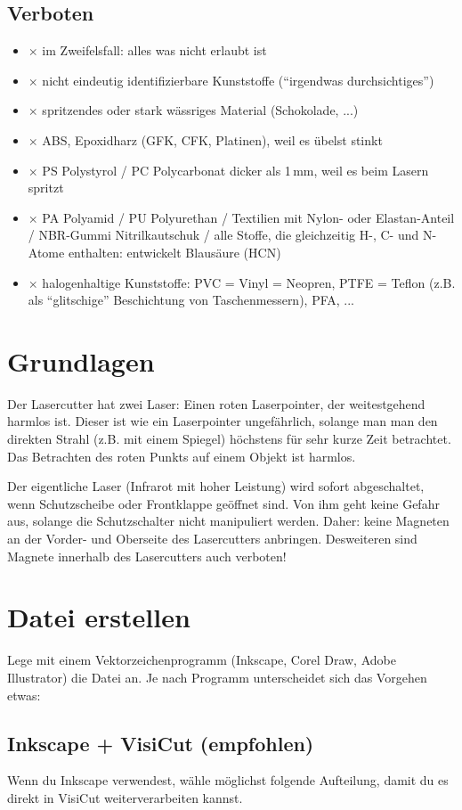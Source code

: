 \documentclass{\basedir/fablab-document}
\begin{document}
	\subsection{Verboten}
	\newcommand{\itemCross}{\item[$\times$]}
	\begin{itemize}
		\itemCross im Zweifelsfall: alles was nicht erlaubt ist
		\itemCross nicht eindeutig identifizierbare Kunststoffe (\enquote{irgendwas durchsichtiges})
		\itemCross spritzendes oder stark wässriges Material (Schokolade, ...)
		\itemCross ABS, Epoxidharz (GFK, CFK, Platinen), weil es übelst stinkt
		\itemCross PS Polystyrol / PC Polycarbonat dicker als 1\,mm, weil es beim Lasern spritzt
		\itemCross PA Polyamid / PU Polyurethan / Textilien mit Nylon- oder Elastan-Anteil / NBR-Gummi Nitrilkautschuk / alle Stoffe, die gleichzeitig H-, C- und N-Atome enthalten: entwickelt Blausäure (HCN)
		\itemCross halogenhaltige Kunststoffe: PVC = Vinyl = Neopren, PTFE = Teflon (z.B. als \enquote{glitschige} Beschichtung von Taschenmessern), PFA, ...
	\end{itemize}
	
	\section{Grundlagen}
	Der Lasercutter hat zwei Laser: Einen roten Laserpointer, der weitestgehend harmlos ist. Dieser ist wie ein Laserpointer ungefährlich, solange man man den direkten Strahl (z.B. mit einem Spiegel) höchstens für sehr kurze Zeit betrachtet. Das Betrachten des roten Punkts auf einem Objekt ist harmlos.
	
	Der eigentliche Laser (Infrarot mit hoher Leistung) wird sofort abgeschaltet, wenn Schutzscheibe oder Frontklappe geöffnet sind. Von ihm geht keine Gefahr aus, solange die Schutzschalter nicht manipuliert werden. Daher: keine Magneten an der Vorder- und Oberseite des Lasercutters anbringen. Desweiteren sind Magnete innerhalb des Lasercutters auch verboten!
	
	\section{Datei erstellen}
	Lege mit einem Vektorzeichenprogramm (Inkscape, Corel Draw, Adobe Illustrator) die Datei an. Je nach Programm unterscheidet sich das Vorgehen etwas:
	
	\subsection{Inkscape + VisiCut (empfohlen)}
	Wenn du Inkscape verwendest, wähle möglichst folgende Aufteilung, damit du es direkt in VisiCut weiterverarbeiten kannst.
	
\end{document}

